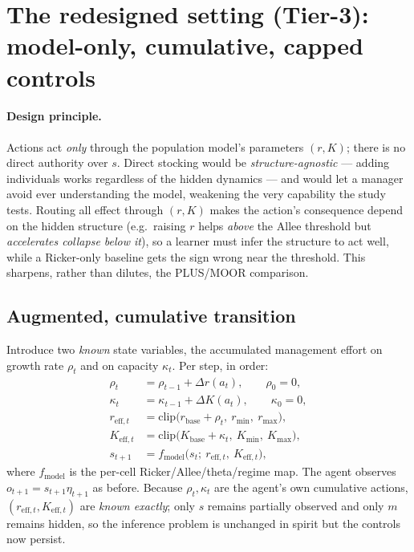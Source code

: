 \documentclass[11pt]{article}
\newcommand{\rbase}{r_{\mathrm{base}}}
\newcommand{\Kbase}{K_{\mathrm{base}}}
\newcommand{\rmax}{r_{\max}}
\newcommand{\rmin}{r_{\min}}
\newcommand{\Kmax}{K_{\max}}
\newcommand{\Kmin}{K_{\min}}
\begin{document}
\section{The redesigned setting (Tier-3): model-only, cumulative, capped controls}
\label{sec:tier3}

\paragraph{Design principle.} Actions act \emph{only} through the population
model's parameters $(r,K)$; there is no direct authority over $s$. Direct stocking
would be \emph{structure-agnostic} --- adding individuals works regardless of the
hidden dynamics --- and would let a manager avoid ever understanding the model,
weakening the very capability the study tests. Routing all effect through $(r,K)$
makes the action's consequence depend on the hidden structure (e.g.\ raising $r$
helps \emph{above} the Allee threshold but \emph{accelerates collapse below it}),
so a learner must infer the structure to act well, while a Ricker-only baseline
gets the sign wrong near the threshold. This sharpens, rather than dilutes, the
PLUS/MOOR comparison.

\subsection{Augmented, cumulative transition}
Introduce two \emph{known} state variables, the accumulated management effort on
growth rate $\rho_t$ and on capacity $\kappa_t$. Per step, in order:
\begin{align}
\rho_t &= \rho_{t-1}+\Delta r(a_t), \qquad \rho_0=0, \\
\kappa_t &= \kappa_{t-1}+\Delta K(a_t), \qquad \kappa_0=0, \\
r_{\mathrm{eff},t} &= \mathrm{clip}\big(\rbase+\rho_t,\ \rmin,\ \rmax\big), \\
K_{\mathrm{eff},t} &= \mathrm{clip}\big(\Kbase+\kappa_t,\ \Kmin,\ \Kmax\big), \\
s_{t+1} &= f_{\mathrm{model}}\big(s_t;\ r_{\mathrm{eff},t},\ K_{\mathrm{eff},t}\big),
\label{eq:cumdyn}
\end{align}
where $f_{\mathrm{model}}$ is the per-cell Ricker/Allee/theta/regime map. The
agent observes $o_{t+1}=s_{t+1}\eta_{t+1}$ as before. Because $\rho_t,\kappa_t$ are
the agent's own cumulative actions, $(r_{\mathrm{eff},t},K_{\mathrm{eff},t})$ are \emph{known
exactly}; only $s$ remains partially observed and only $m$ remains hidden, so the
inference problem is unchanged in spirit but the controls now persist.
\end{document}
